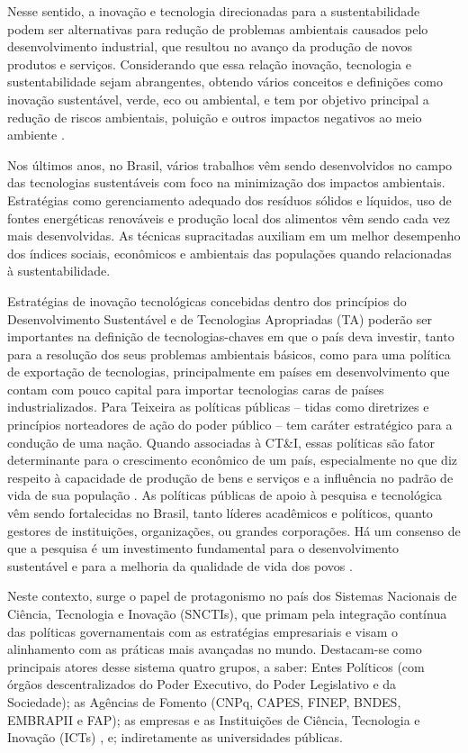 Nesse sentido, a inovação e tecnologia direcionadas para a sustentabilidade podem ser alternativas para redução de problemas ambientais causados pelo desenvolvimento industrial, que resultou no avanço da produção de novos produtos e serviços. Considerando que essa relação inovação, tecnologia e sustentabilidade sejam abrangentes, obtendo vários conceitos e definições como inovação sustentável, verde, eco ou ambiental, e tem por objetivo principal a redução de riscos ambientais, poluição e outros impactos negativos ao meio ambiente
\cite{pinsky_inovacao_2017}.  

Nos últimos anos, no Brasil, vários trabalhos vêm sendo desenvolvidos no campo das tecnologias sustentáveis com foco na minimização dos impactos ambientais. Estratégias como gerenciamento adequado dos resíduos sólidos e líquidos, uso de fontes energéticas renováveis e produção local dos alimentos vêm sendo cada vez mais desenvolvidas. As técnicas supracitadas auxiliam em um melhor desempenho dos índices sociais, econômicos e ambientais das populações quando relacionadas à sustentabilidade.

Estratégias de inovação tecnológicas concebidas dentro dos princípios do Desenvolvimento Sustentável e de Tecnologias Apropriadas (TA) poderão ser importantes na definição de tecnologias-chaves em que o país deva investir, tanto para a resolução dos seus problemas ambientais básicos, como para uma política de exportação de tecnologias, principalmente em países em desenvolvimento que contam com pouco capital para importar tecnologias caras de países industrializados. Para Teixeira  as políticas públicas – tidas como diretrizes e princípios norteadores de ação do poder público – tem caráter estratégico para a condução de uma nação. Quando associadas à CT\&I, essas políticas são fator determinante para o crescimento econômico de um país, especialmente no que diz respeito à capacidade de produção de bens e serviços e a influência no padrão de vida de sua população .
As políticas públicas de apoio à pesquisa e tecnológica vêm sendo fortalecidas no Brasil, tanto líderes acadêmicos e políticos, quanto gestores de instituições, organizações, ou grandes corporações.  Há um consenso de que a pesquisa é um investimento fundamental para o desenvolvimento sustentável e para a melhoria da qualidade de vida dos povos \cite{bufrem_politicas_2018}.

Neste contexto, surge o papel de protagonismo no país dos Sistemas Nacionais de Ciência, Tecnologia e Inovação (SNCTIs), que primam pela integração contínua das políticas governamentais com as estratégias empresariais e visam o alinhamento com as práticas mais avançadas no mundo. Destacam-se como principais atores desse sistema quatro grupos, a saber: Entes Políticos (com órgãos descentralizados do Poder Executivo, do Poder Legislativo e da Sociedade); as Agências de Fomento (CNPq, CAPES, FINEP, BNDES, EMBRAPII e FAP); as empresas e as Instituições de Ciência, Tecnologia e Inovação (ICTs) \cite{mcti_estrategia_2016}, e; indiretamente as universidades públicas.

